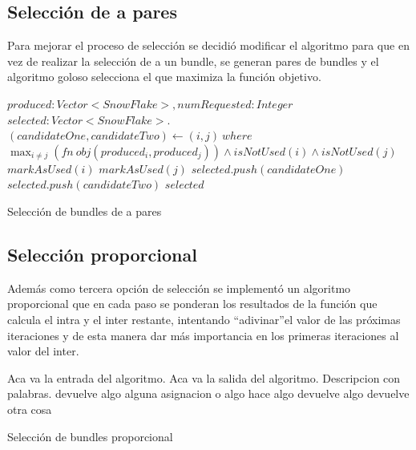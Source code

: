 \subsection{Selección de a pares}
Para mejorar el proceso de selección se decidió modificar el algoritmo para que en vez de realizar 
la selección de a un bundle, se generan pares de bundles y el algoritmo goloso selecciona el que 
maximiza la función objetivo.
\begin{algorithm}[H]
\begin{algorithmic}[1]
\REQUIRE $produced:Vector<SnowFlake>, numRequested:Integer$
\ENSURE $selected:Vector<SnowFlake>$.
\STATE $(candidateOne, candidateTwo) \leftarrow (i, j)\ where$ \\ 
$\displaystyle\max_{i \neq j} (fn\ obj(produced_{i},produced_{j})) \wedge isNotUsed(i) \wedge 
isNotUsed(j)$
\STATE $markAsUsed(i)$
\STATE $markAsUsed(j)$
\STATE $selected.push(candidateOne)$
\STATE $selected.push(candidateTwo)$
\ENDWHILE
\RETURN $selected$
\end{algorithmic}
\caption{Selección de bundles de a pares}\label{alg:algSelTuple}
\end{algorithm}
\subsection{Selección proporcional}
Además como tercera opción de selección se implementó un algoritmo proporcional que en cada paso se 
ponderan los resultados de la función que calcula el intra y el inter restante, intentando 
\textquotedblleft adivinar\textquotedblright  el valor de las próximas iteraciones y de esta manera 
dar más importancia en los primeras iteraciones al valor del inter.
\begin{algorithm}[H]
\begin{algorithmic}[1]
\REQUIRE Aca va la entrada del algoritmo.
\ENSURE Aca va la salida del algoritmo.
\STATE Descripcion con palabras.
\RETURN devuelve algo
\ELSE
\STATE alguna asignacion o algo
\ENDIF
\ENDWHILE
{}
\STATE hace algo
\RETURN devuelve algo
\ENDIF
\ENDFOR
\RETURN devuelve otra cosa
\end{algorithmic}
\caption{Selección de bundles proporcional}\label{alg:algSelProp}
\end{algorithm}

